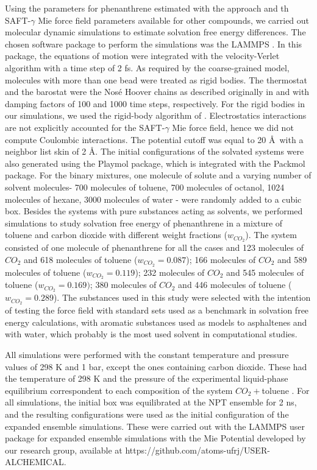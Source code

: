 Using the parameters for phenanthrene estimated with the  approach and th SAFT-$\gamma$ Mie force field parameters available for other compounds, we carried out molecular dynamic simulations to estimate solvation free energy differences. The chosen software package to perform the simulations was the LAMMPS  \cite{lammps}. In this package, the equations of motion were integrated with the velocity-Verlet algorithm \cite{verlet} with a time step of 2 fs. As required by the coarse-grained model,  molecules with more than one bead were treated as rigid bodies. The thermostat and the barostat were the Nos\'{e} Hoover chains as described originally in  and  with damping factors of 100 and 1000 time steps, respectively. For the rigid bodies in our simulations, we used the rigid-body algorithm of . Electrostatics interactions are not explicitly accounted for the SAFT-$\gamma$ Mie force field, hence we did not compute Coulombic interactions. The potential cutoff was equal to 20 \AA $\,$ \cite{muller2017} with a neighbor list skin of 2 \AA. The initial configurations of the solvated systems were also generated using the Playmol package, which is integrated with the Packmol package. For the binary mixtures, one molecule of solute and a varying number of solvent molecules- 700 molecules of toluene, 700 molecules of octanol, 1024 molecules of hexane, 3000 molecules of water - were randomly added to a cubic box. Besides the systems with pure substances acting as solvents, we performed simulations to study solvation free energy of phenanthrene in a mixture of toluene and carbon dioxide with different weight fractions ($w_{CO_{2}}$). The  system consisted of one molecule of phenanthrene for all the cases and 123 molecules of $CO_{2}$ and 618 molecules of toluene ($w_{CO_{2}} = 0.087$); 166 molecules of $CO_{2}$ and 589 molecules of toluene ($w_{CO_{2}} = 0.119$); 232 molecules of $CO_{2}$ and 545 molecules of toluene ($w_{CO_{2}} = 0.169)$; 380 molecules of $CO_{2}$ and 446 molecules of toluene ($w_{CO_{2}} = 0.289$). The substances used in this study were selected with the intention of testing the force field with standard sets used as a benchmark in solvation free energy calculations, with aromatic substances used as models to asphaltenes and with water, which probably is the most used solvent in computational studies.

All simulations were performed with the constant temperature and pressure values of 298 K and 1 bar, except the ones containing carbon dioxide. These had the temperature of 298 K and the pressure of the experimental liquid-phase equilibrium correspondent to each composition of the system $CO_{2}+$toluene \cite{co2toliq}. For all simulations, the initial box was equilibrated at the NPT ensemble for 2 ns, and the resulting configurations were used as the initial configuration of the expanded ensemble simulations. These were carried out with the LAMMPS user package for expanded ensemble simulations with the Mie Potential developed by our research group, available at https://github.com/atoms-ufrj/USER-ALCHEMICAL. 

